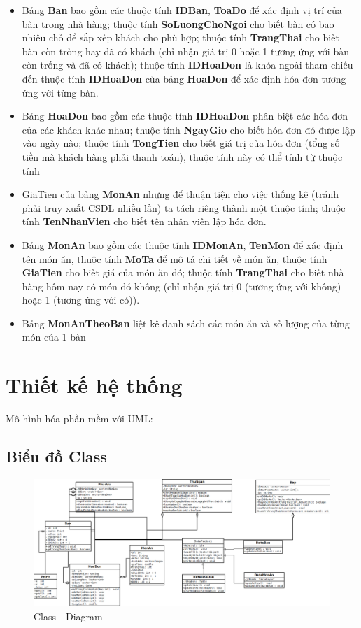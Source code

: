 \documentclass[a4paper,12pt]{report}
\begin{document}
\begin{itemize}
\item Bảng \textbf{Ban} bao gồm các thuộc tính \textbf{IDBan}, \textbf{ToaDo} để xác định vị trí của bàn trong nhà hàng; thuộc tính \textbf{SoLuongChoNgoi} cho biết bàn có bao nhiêu chỗ để sắp xếp khách cho phù hợp; thuộc tính \textbf{TrangThai} cho biết bàn còn trống hay đã có khách (chỉ nhận giá trị 0 hoặc 1 tương ứng với bàn còn trống và đã có khách); thuộc tính \textbf{IDHoaDon} là khóa ngoài tham chiếu đến thuộc tính \textbf{IDHoaDon} của bảng \textbf{HoaDon} để xác định hóa đơn tương ứng với từng bàn.
\item Bảng \textbf{HoaDon} bao gồm các thuộc tính \textbf{IDHoaDon} phân biệt các hóa đơn của các khách khác nhau; thuộc tính \textbf{NgayGio} cho biết hóa đơn đó được lập vào ngày nào; thuộc tính \textbf{TongTien} cho biết giá trị của hóa đơn (tổng số tiền mà khách hàng phải thanh toán), thuộc tính này có thể tính từ thuộc tính \item{GiaTien} của bảng \textbf{MonAn} nhưng để thuận tiện cho việc thống kê (tránh phải truy xuất CSDL nhiều lần) ta tách riêng thành một thuộc tính; thuộc tính \textbf{TenNhanVien} cho biết tên nhân viên lập hóa đơn.
\item Bảng \textbf{MonAn} bao gồm các thuộc tính \textbf{IDMonAn}, \textbf{TenMon} để xác định tên món ăn, thuộc tính \textbf{MoTa} để mô tả chi tiết về món ăn, thuộc tính \textbf{GiaTien} cho biết giá của món ăn đó; thuộc tính \textbf{TrangThai} cho biết nhà hàng hôm nay có món đó không (chỉ nhận giá trị 0 (tương ứng với không) hoặc 1 (tương ứng với có)).
\item Bảng \textbf{MonAnTheoBan} liệt kê danh sách các món ăn và số lượng của từng món của 1 bàn   
\end{itemize}

\chapter{Thiết kế hệ thống}
Mô hình hóa phần mềm với UML:

\begin{landscape}
	\section{Biểu đồ Class}
	\begin{figure}[H]
		\centering
		\includegraphics[scale=0.50]{UML-Final.png}
		\caption{Class - Diagram}
	\end{figure}
\end{landscape}
\restoregeometry
\end{document}
